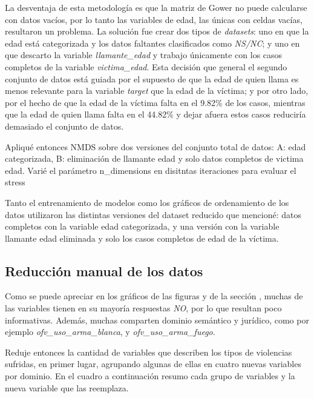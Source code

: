 \documentclass[10 pt]{article}
\begin{document}
La desventaja de esta metodología es que la matriz de Gower no puede calcularse con datos vacíos, por lo tanto las variables de edad, las únicas con celdas vacías, resultaron un problema. La solución fue crear dos tipos de \textit{datasets}: uno en que la edad está categorizada y los datos faltantes clasificados como \textit{NS/NC}; y uno en que descarto la variable \textit{llamante\_edad} y trabajo únicamente con los casos completos de la variable \textit{victima\_edad}. Esta decisión que general el segundo conjunto de datos está guiada por el supuesto de que la edad de quien llama es menos relevante para la variable \textit{target} que la edad de la víctima; y por otro lado, por el hecho de que la edad de la víctima falta en el 9.82\% de los casos, mientras que la edad de quien llama falta en el 44.82\% y dejar afuera estos casos reduciría demasiado el conjunto de datos. 

Apliqué entonces NMDS sobre dos versiones del conjunto total de datos: A: edad categorizada, B: eliminación de llamante edad y solo datos completos de victima edad. Varié el parámetro n\_dimensions en disitntas iteraciones para evaluar el stress 

Tanto el entrenamiento de modelos como los gráficos de ordenamiento de los datos utilizaron las distintas versiones del dataset reducido que mencioné: datos completos con la variable edad categorizada, y una versión con la variable llamante edad eliminada y solo los casos completos de edad de la víctima. 

\subsection{Reducción manual de los datos}



Como se puede apreciar en los gráficos de las figuras  y  de la sección , muchas de las variables tienen en su mayoría respuestas \textit{NO}, por lo que resultan poco informativas. Además, muchas comparten dominio semántico y jurídico, como por ejemplo \textit{ofv\_uso\_arma\_blanca}, y \textit{ofv\_uso\_arma\_fuego}.

Reduje entonces la cantidad de variables que describen los tipos de violencias sufridas, en primer lugar, agrupando algunas de ellas en cuatro nuevas variables por dominio. En el cuadro  a continuación resumo cada grupo de variables y la nueva variable que las reemplaza. 
\end{document}
